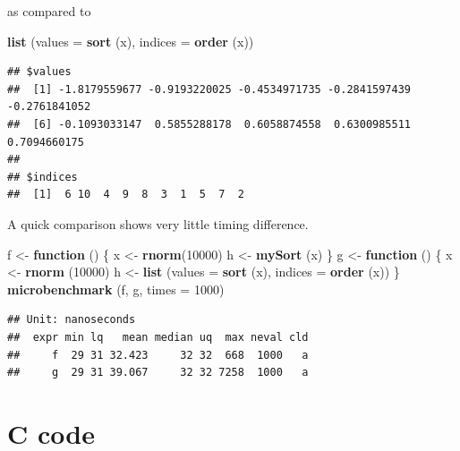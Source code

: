 \documentclass[12pt,]{article}
\newenvironment{Shaded}{\begin{snugshade}}{\end{snugshade}}
\newcommand{\KeywordTok}[1]{\textcolor[rgb]{0.13,0.29,0.53}{\textbf{#1}}}
\newcommand{\DataTypeTok}[1]{\textcolor[rgb]{0.13,0.29,0.53}{#1}}
\newcommand{\DecValTok}[1]{\textcolor[rgb]{0.00,0.00,0.81}{#1}}
\newcommand{\StringTok}[1]{\textcolor[rgb]{0.31,0.60,0.02}{#1}}
\newcommand{\ControlFlowTok}[1]{\textcolor[rgb]{0.13,0.29,0.53}{\textbf{#1}}}
\newcommand{\NormalTok}[1]{#1}
\begin{document}
as compared to

\begin{Shaded}
\begin{Highlighting}[]
\KeywordTok{list}\NormalTok{ (}\DataTypeTok{values =} \KeywordTok{sort}\NormalTok{ (x), }\DataTypeTok{indices =} \KeywordTok{order}\NormalTok{ (x))}
\end{Highlighting}
\end{Shaded}

\begin{verbatim}
## $values
##  [1] -1.8179559677 -0.9193220025 -0.4534971735 -0.2841597439 -0.2761841052
##  [6] -0.1093033147  0.5855288178  0.6058874558  0.6300985511  0.7094660175
## 
## $indices
##  [1]  6 10  4  9  8  3  1  5  7  2
\end{verbatim}

A quick comparison shows very little timing difference.

\begin{Shaded}
\begin{Highlighting}[]
\NormalTok{f <-}\StringTok{ }\ControlFlowTok{function}\NormalTok{ () \{}
\NormalTok{  x <-}\StringTok{ }\KeywordTok{rnorm}\NormalTok{(}\DecValTok{10000}\NormalTok{)}
\NormalTok{  h <-}\StringTok{ }\KeywordTok{mySort}\NormalTok{ (x)}
\NormalTok{\}}
\NormalTok{g <-}\StringTok{ }\ControlFlowTok{function}\NormalTok{ () \{}
\NormalTok{  x <-}\StringTok{ }\KeywordTok{rnorm}\NormalTok{ (}\DecValTok{10000}\NormalTok{)}
\NormalTok{  h <-}\StringTok{ }\KeywordTok{list}\NormalTok{ (}\DataTypeTok{values =} \KeywordTok{sort}\NormalTok{ (x), }\DataTypeTok{indices =} \KeywordTok{order}\NormalTok{ (x))}
\NormalTok{\}}
\KeywordTok{microbenchmark}\NormalTok{ (f, g, }\DataTypeTok{times =} \DecValTok{1000}\NormalTok{)}
\end{Highlighting}
\end{Shaded}

\begin{verbatim}
## Unit: nanoseconds
##  expr min lq   mean median uq  max neval cld
##     f  29 31 32.423     32 32  668  1000   a
##     g  29 31 39.067     32 32 7258  1000   a
\end{verbatim}

\section{C code}\label{c-code}
\end{document}
